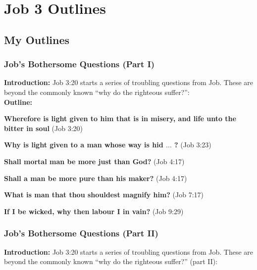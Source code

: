 \section{Job 3 Outlines}

\subsection{My Outlines}

\subsubsection{Job's Bothersome Questions (Part I)}

\textbf{Introduction:} Job 3:20 starts a series of troubling questions from Job. These are beyond the commonly known ``why do the righteous suffer?'':\\
\textbf{Outline:} 

\begin{compactenum}[I.][19]
    \item  \textbf{Wherefore is light given to him that is
in misery, and life unto the bitter in soul} (Job 3:20)
    \item  \textbf{Why is light given to a man whose way is hid $\hdots$ ?} (Job 3:23)
    \item  \textbf{Shall mortal man be more just than God?} (Job 4:17)
    \item  \textbf{Shall a man be more pure than his maker?} (Job 4:17) 
    \item  \textbf{What is man that thou shouldest magnify him?} (Job 7:17)
    \item  \textbf{If I be wicked, why then labour I in vain?} (Job 9:29)
\end{compactenum}

\subsubsection{Job's Bothersome Questions (Part II)}
\textbf{Introduction:} Job 3:20 starts a series of troubling questions from Job. These are beyond the commonly known ``why do the righteous suffer?'' (part II):

